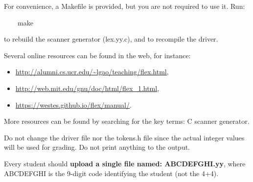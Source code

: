 \documentclass[letter,11pt]{article}
\begin{document}
For convenience, a Makefile is provided, but you are not required to use it.
Run: 

~~~~make

to rebuild the scanner generator (lex.yy.c), and to recompile the driver.

Several online resources can be found in the web, for instance:
\begin{itemize}
\item
\url{http://alumni.cs.ucr.edu/~lgao/teaching/flex.html}, 
\item
\url{http://web.mit.edu/gnu/doc/html/flex_1.html},
\item
\url{https://westes.github.io/flex/manual/}.
\end{itemize}

More resources can be found by searching for the key terms: C scanner generator.

Do not change the driver file nor the tokens.h file since the actual integer values will be used for grading. Do not print anything to the output.

Every student should {\bf upload a single file named: ABCDEFGHI.yy}, where ABCDEFGHI is the 9-digit code identifying the student (not the 4+4).
\end{document}
